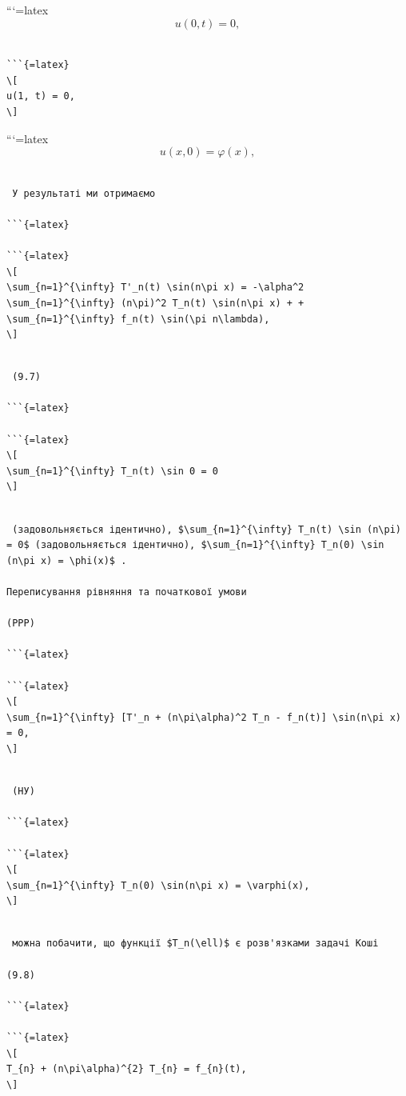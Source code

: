\documentclass[
  ukrainian,
]{article}
\begin{document}
```{=latex}
\[
u(0, t) = 0,
\]

\begin{verbatim}

```{=latex}
\[
u(1, t) = 0,
\]
\end{verbatim}

```{=latex}
\[
u(x, 0) = \varphi(x),
\]

\begin{verbatim}

 У результаті ми отримаємо

```{=latex}

```{=latex}
\[
\sum_{n=1}^{\infty} T'_n(t) \sin(n\pi x) = -\alpha^2 \sum_{n=1}^{\infty} (n\pi)^2 T_n(t) \sin(n\pi x) + + \sum_{n=1}^{\infty} f_n(t) \sin(\pi n\lambda),
\]
\end{verbatim}

\begin{verbatim}

 (9.7)

```{=latex}

```{=latex}
\[
\sum_{n=1}^{\infty} T_n(t) \sin 0 = 0
\]
\end{verbatim}

\begin{verbatim}

 (задовольняється ідентично), $\sum_{n=1}^{\infty} T_n(t) \sin (n\pi) = 0$ (задовольняється ідентично), $\sum_{n=1}^{\infty} T_n(0) \sin (n\pi x) = \phi(x)$ .

Переписування рівняння та початкової умови

(PPP)

```{=latex}

```{=latex}
\[
\sum_{n=1}^{\infty} [T'_n + (n\pi\alpha)^2 T_n - f_n(t)] \sin(n\pi x) = 0,
\]
\end{verbatim}

\begin{verbatim}

 (НУ)

```{=latex}

```{=latex}
\[
\sum_{n=1}^{\infty} T_n(0) \sin(n\pi x) = \varphi(x),
\]
\end{verbatim}

\begin{verbatim}

 можна побачити, що функції $T_n(\ell)$ є розв'язками задачі Коші

(9.8)

```{=latex}

```{=latex}
\[
T_{n} + (n\pi\alpha)^{2} T_{n} = f_{n}(t),
\]
\end{verbatim}
\end{document}
